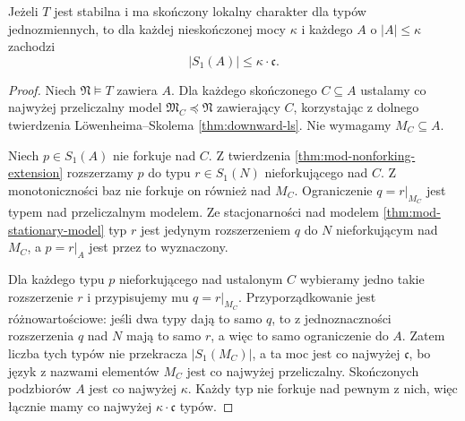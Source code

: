 \begin{lemat}
\label{lem:mod-finite-local-upper}
Jeżeli $T$ jest stabilna i ma skończony
lokalny charakter dla typów jednozmiennych,
to dla każdej nieskończonej mocy $\kappa$
i każdego $A$ o $|A|\leq\kappa$ zachodzi
\[
|S_1(A)|\leq\kappa\cdot\mathfrak c.
\]
\end{lemat}
\begin{proof}
Niech $\mathfrak N\models T$ zawiera $A$.
Dla każdego skończonego $C\subseteq A$
ustalamy co najwyżej przeliczalny model
$\mathfrak M_C\preccurlyeq\mathfrak N$
zawierający $C$, korzystając z dolnego
twierdzenia Löwenheima--Skolema
\ref{thm:downward-ls}.
Nie wymagamy $M_C\subseteq A$.

Niech $p\in S_1(A)$ nie forkuje nad $C$.
Z twierdzenia \ref{thm:mod-nonforking-extension}
rozszerzamy $p$ do typu $r\in S_1(N)$
nieforkującego nad $C$.
Z monotoniczności baz nie forkuje on
również nad $M_C$.
Ograniczenie $q=r|_{M_C}$ jest typem
nad przeliczalnym modelem.
Ze stacjonarności nad modelem
\ref{thm:mod-stationary-model}
typ $r$ jest jedynym rozszerzeniem $q$
do $N$ nieforkującym nad $M_C$,
a $p=r|_A$ jest przez to wyznaczony.

Dla każdego typu $p$ nieforkującego nad ustalonym
$C$ wybieramy jedno takie rozszerzenie $r$ i
przypisujemy mu $q=r|_{M_C}$. Przyporządkowanie
jest różnowartościowe: jeśli dwa typy dają to samo
$q$, to z jednoznaczności rozszerzenia $q$ nad $N$
mają to samo $r$, a więc to samo ograniczenie do $A$.
Zatem liczba tych typów nie przekracza $|S_1(M_C)|$,
a ta moc jest co najwyżej $\mathfrak c$,
bo język z nazwami elementów $M_C$
jest co najwyżej przeliczalny.
Skończonych podzbiorów $A$ jest
co najwyżej $\kappa$.
Każdy typ nie forkuje nad pewnym z nich,
więc łącznie mamy co najwyżej
$\kappa\cdot\mathfrak c$ typów.
\end{proof}


